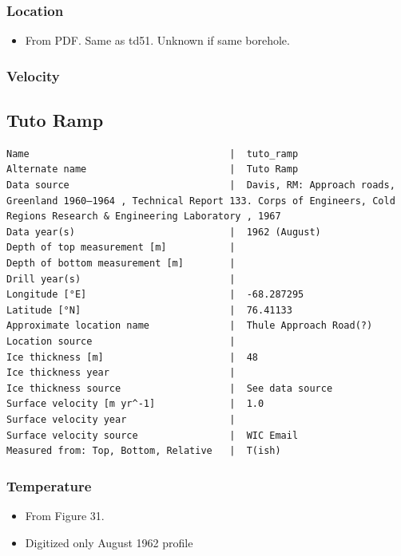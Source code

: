 \documentclass[article,a4paper,times,11pt,twoside]{article}
\begin{document}
\subsubsection{Location}
\label{sec:org35921e0}

\begin{itemize}
\item From PDF. Same as td51. Unknown if same borehole.
\end{itemize}

\subsubsection{Velocity}
\label{sec:org67cf2b9}
\clearpage
\subsection{Tuto Ramp}
\label{sec:orge8a62bb}
\begin{verbatim}
Name                                   |  tuto_ramp
Alternate name                         |  Tuto Ramp
Data source                            |  Davis, RM: Approach roads, Greenland 1960–1964 , Technical Report 133. Corps of Engineers, Cold Regions Research & Engineering Laboratory , 1967 
Data year(s)                           |  1962 (August)
Depth of top measurement [m]           |  
Depth of bottom measurement [m]        |  
Drill year(s)                          |  
Longitude [°E]                         |  -68.287295
Latitude [°N]                          |  76.41133
Approximate location name              |  Thule Approach Road(?)
Location source                        |  
Ice thickness [m]                      |  48
Ice thickness year                     |  
Ice thickness source                   |  See data source
Surface velocity [m yr^-1]             |  1.0
Surface velocity year                  |  
Surface velocity source                |  WIC Email
Measured from: Top, Bottom, Relative   |  T(ish)
\end{verbatim}

\subsubsection{Temperature}
\label{sec:org4be06da}

\begin{itemize}
\item From \textcite{davis_1967} Figure 31.
\item Digitized only August 1962 profile
\end{itemize}
\end{document}
